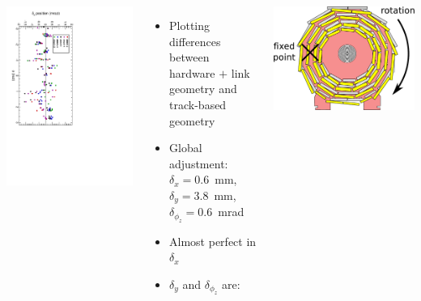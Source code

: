 \documentclass[compress]{beamer}
\begin{document}
\begin{frame}
\begin{columns}
\includegraphics[height=\linewidth, angle=90]{NOV4DT_vs_HARDWAREadjust_phi.pdf}

\begin{itemize}
\item Plotting differences between hardware $+$ link geometry and track-based geometry
\item Global adjustment: $\delta_x = 0.6$~mm, $\delta_y = 3.8$~mm, $\delta_{\phi_z} = 0.6$~mrad
\item Almost perfect in $\delta_x$
\item $\delta_y$ and $\delta_{\phi_z}$ are:
\end{itemize}

\includegraphics[width=0.9\linewidth]{adjustment_cartoon.pdf}
\end{columns}
\end{frame}
\end{document}
